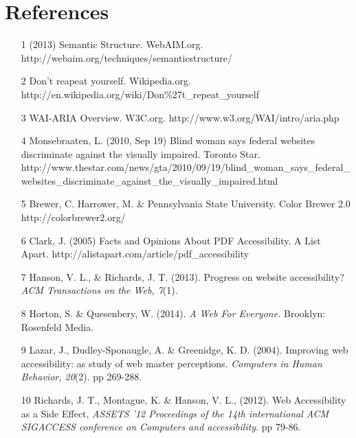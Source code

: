 \documentclass{acm_proc_article-sp}
\begin{document}
\section{References}
\begin{itemize}
\item[1] (2013) Semantic Structure. WebAIM.org. \\http://webaim.org/techniques/semanticstructure/
\item[2] Don't reapeat yourself. Wikipedia.org. \\http://en.wikipedia.org/wiki/Don\%27t\_repeat\_yourself
\item[3] WAI-ARIA Overview. W3C.org. http://www.w3.org/WAI/intro/aria.php
\item[4] Monsebraaten, L. (2010, Sep 19) Blind woman says federal websites discriminate against the visually
impaired. Toronto Star.
http://www.thestar.com/news/gta/2010/09/19/blind\_woman\_says\_federal\_websites\_discriminate\_against\_the\_visually\_impaired.html
\item[5] Brewer, C. Harrower, M. \& Pennsylvania State University. Color Brewer 2.0 http://colorbrewer2.org/
\item[6] Clark, J. (2005) Facts and Opinions About PDF Accessibility. A List Apart.
http://alistapart.com/article/pdf\_accessibility
\item [7] Hanson, V. L., \& Richards, J. T. (2013). Progress on website accessibility? {\it ACM Transactions on the Web, 7}(1).
\item [8] Horton, S. \& Quesenbery, W. (2014). {\it A Web For Everyone.} Brooklyn: Rosenfeld Media.
\item [9] Lazar, J., Dudley-Sponaugle, A. \& Greenidge, K. D. (2004). Improving web accessibility: as study of web master perceptions. {\it Computers in Human Behavior, 20}(2). pp 269-288.
\item [10] Richards, J. T., Montague, K. \& Hanson, V. L., (2012). Web Accessibility as a Side Effect, {\it ASSETS '12 Proceedings of the 14th international ACM SIGACCESS conference on Computers and accessibility}. pp 79-86.
\end{itemize}
\end{document}
